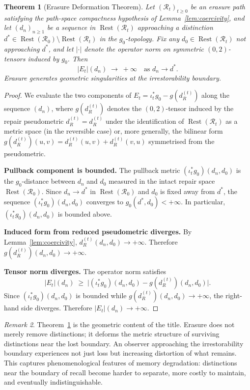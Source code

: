 \documentclass[12pt, oneside]{article}
\theoremstyle{plain}
\newtheorem{theorem}{Theorem}[section]
\theoremstyle{definition}
\theoremstyle{remark}
\newtheorem{remark}[theorem]{Remark}
\DeclareMathOperator{\Rest}{Rest}
\newcommand{\Rt}{\mathcal{R}_t}
\newcommand{\Rzero}{\mathcal{R}_0}
\newcommand{\Restzt}{\Rest(\Rt)}
\newcommand{\Restzero}{\Rest(\Rzero)}
\newcommand{\iotat}{\iota_t}
\newcommand{\Et}{E_t}
\newcommand{\gzero}{g_0}
\newcommand{\dRt}{d_R^{(t)}}
\begin{document}
\begin{theorem}[Erasure Deformation Theorem]
  Let $(\Rt)_{t \geq 0}$ be an erasure path satisfying the
  path-space compactness hypothesis of Lemma~\ref{lem:coercivity},
  and let $(d_n)_{n \geq 1}$ be a sequence in $\Restzt$ approaching
  a distinction $d^* \in \Restzero \setminus \Restzt$ in the
  $\gzero$-topology.
  Fix any $d_0 \in \Restzt$ not approaching $d^*$, and let
  $|\cdot|$ denote the operator norm on symmetric $(0,2)$-tensors
  induced by $\gzero$.
  Then
  \[
    |\Et|(d_n) \;\to\; +\infty
    \quad\text{as } d_n \to d^*.
  \]
  Erasure generates geometric singularities at the irrestorability
  boundary.
  \label{thm:deformation}
\end{theorem}

\begin{proof}
  We evaluate the two components of $\Et = \iotat^* \gzero - g(\dRt)$
  along the sequence $(d_n)$, where $g(\dRt)$ denotes the
  $(0,2)$-tensor induced by the repair pseudometric $\dRt =
  d_R^{(t)}$ under the identification of $\Restzt$ as a metric
  space (in the reversible case) or, more generally, the bilinear
  form $g(\dRt)(u,v) = \dRt(u, v) + \dRt(v, u)$ symmetrised from
  the pseudometric.

  \textbf{Pullback component is bounded.}\;
  The pullback metric $(\iotat^* \gzero)(d_n, d_0)$ is the
  $\gzero$-distance between $d_n$ and $d_0$ measured in the
  intact repair space $\Restzero$.
  Since $d_n \to d^*$ in $\Restzero$ and $d_0$ is fixed away from
  $d^*$, the sequence $(\iotat^* \gzero)(d_n, d_0)$ converges to
  $\gzero(d^*, d_0) < +\infty$.
  In particular, $(\iotat^* \gzero)(d_n, d_0)$ is bounded above.

  \textbf{Induced form from reduced pseudometric diverges.}\;
  By Lemma~\ref{lem:coercivity}, $\dRt(d_n, d_0) \to +\infty$.
  Therefore $g(\dRt)(d_n, d_0) \to +\infty$.

  \textbf{Tensor norm diverges.}\;
  The operator norm satisfies
  \[
    |\Et|(d_n)
    \;\geq\;
    \bigl|(\iotat^* \gzero)(d_n, d_0) - g(\dRt)(d_n, d_0)\bigr|.
  \]
  Since $(\iotat^* \gzero)(d_n, d_0)$ is bounded while
  $g(\dRt)(d_n, d_0) \to +\infty$, the right-hand side diverges.
  Therefore $|\Et|(d_n) \to +\infty$.
\end{proof}

\begin{remark}
  Theorem~\ref{thm:deformation} is the geometric content of the
  title.
  Erasure does not merely remove distinctions; it deforms the metric
  structure of surviving distinctions near the lost boundary.
  An observer approaching the irrestorability boundary experiences
  not just loss but increasing distortion of what remains.
  This captures phenomenological features of memory degradation:
  distinctions near the boundary of recall become harder to
  separate, more costly to maintain, and eventually indistinguishable.
\end{remark}
\end{document}
